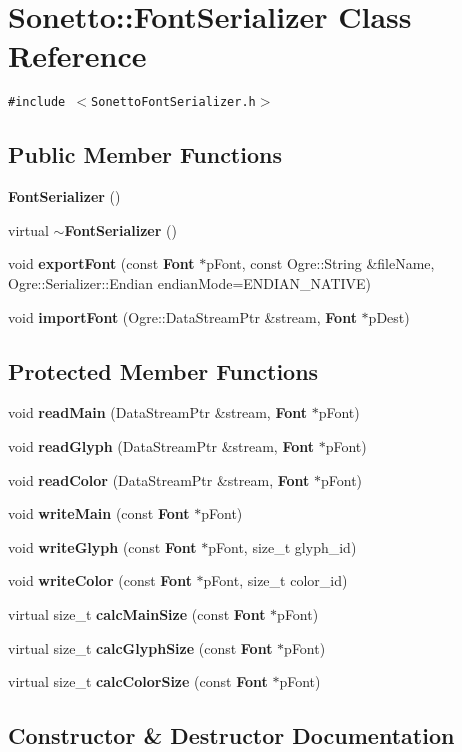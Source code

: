 \section{Sonetto::FontSerializer Class Reference}
\label{class_sonetto_1_1_font_serializer}
{\tt \#include $<$SonettoFontSerializer.h$>$}

\subsection*{Public Member Functions}
\begin{CompactItemize}
\item 
{\bf FontSerializer} ()
\item 
virtual {\bf $\sim$FontSerializer} ()
\item 
void {\bf exportFont} (const {\bf Font} $\ast$pFont, const Ogre::String \&fileName, Ogre::Serializer::Endian endianMode=ENDIAN\_\-NATIVE)
\item 
void {\bf importFont} (Ogre::DataStreamPtr \&stream, {\bf Font} $\ast$pDest)
\end{CompactItemize}
\subsection*{Protected Member Functions}
\begin{CompactItemize}
\item 
void {\bf readMain} (DataStreamPtr \&stream, {\bf Font} $\ast$pFont)
\item 
void {\bf readGlyph} (DataStreamPtr \&stream, {\bf Font} $\ast$pFont)
\item 
void {\bf readColor} (DataStreamPtr \&stream, {\bf Font} $\ast$pFont)
\item 
void {\bf writeMain} (const {\bf Font} $\ast$pFont)
\item 
void {\bf writeGlyph} (const {\bf Font} $\ast$pFont, size\_\-t glyph\_\-id)
\item 
void {\bf writeColor} (const {\bf Font} $\ast$pFont, size\_\-t color\_\-id)
\item 
virtual size\_\-t {\bf calcMainSize} (const {\bf Font} $\ast$pFont)
\item 
virtual size\_\-t {\bf calcGlyphSize} (const {\bf Font} $\ast$pFont)
\item 
virtual size\_\-t {\bf calcColorSize} (const {\bf Font} $\ast$pFont)
\end{CompactItemize}


\subsection{Constructor \& Destructor Documentation}
